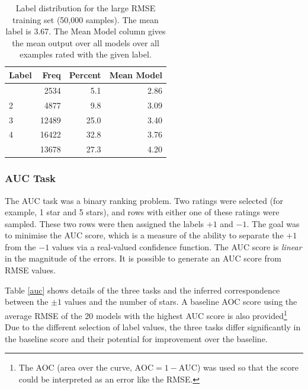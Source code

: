 \documentclass{article}
\begin{document}
\begin{table}[t]
\caption{Label distribution for the large RMSE training set (50,000 samples).  The mean label is 3.67.  The Mean Model column gives the mean output over all models over all examples rated with the given label.}
\label{table:label-frequency}
\vskip 0.15in
\begin{center}
\begin{small}
\begin{sc}
\begin{tabular}{lrrr}
\hline
\abovespace\belowspace
Label & Freq & Percent & Mean Model\\
\hline
\abovespace
1 &  2534 &  5.1 & 2.86 \\
2 &  4877 &  9.8 & 3.09 \\
3 & 12489 & 25.0 & 3.40 \\
4 & 16422 & 32.8 & 3.76 \\
\belowspace
5 & 13678 & 27.3 & 4.20\\
\hline
\end{tabular}
\end{sc}
\end{small}
\end{center}
\vskip -0.1in
\end{table}

\subsubsection{AUC Task}

The AUC task was a binary ranking problem.  Two ratings were selected (for example, 1 star and 5 stars), and rows with either one of these ratings were sampled.  These two rows were then assigned the labels $+1$ and $-1$.  The goal was to minimise the AUC score, which is a measure of the ability to separate the $+1$ from the $-1$ values via a real-valued confidence function.  The AUC score is \emph{linear} in the magnitude of the errors.  It is possible to generate an AUC score from RMSE values.

Table \ref{auc} shows details of the three tasks and the inferred correspondence between the $\pm 1$ values and the number of stars.  A baseline AOC score using the average RMSE of the 20 models with the highest AUC score is also provided\footnote{The AOC (area over the curve, $\mathrm{AOC} = 1 - \mathrm{AUC}$) was used so that the score could be interpreted as an error like the RMSE.}  Due to the different selection of label values, the three tasks differ significantly in the baseline score and their potential for improvement over the baseline.
\end{document}
